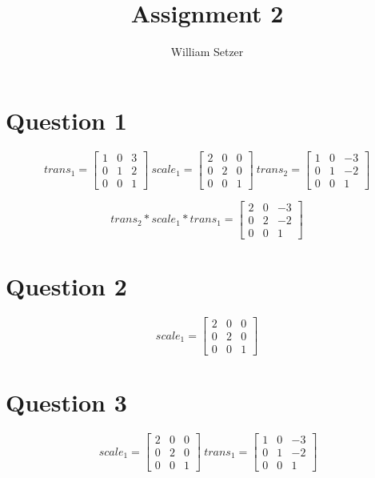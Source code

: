 \documentclass[10pt]{article}
\title{Assignment 2}
\author{William Setzer}
\begin{document}
\maketitle

\section*{Question 1}

\[
  trans_1 = 
  \begin{bmatrix}
    1 & 0 & 3 \\
    0 & 1 & 2 \\
    0 & 0 & 1
  \end{bmatrix}
  \ scale_1 =
  \begin{bmatrix}
    2 & 0 & 0 \\
    0 & 2 & 0 \\
    0 & 0 & 1
  \end{bmatrix}
  \ trans_2 =
  \begin{bmatrix}
    1 & 0 & -3 \\
    0 & 1 & -2 \\
    0 & 0 &  1
  \end{bmatrix}
\]

\[
  trans_2 * scale_1 * trans_1 =
  \begin{bmatrix}
    2 & 0 & -3 \\
    0 & 2 & -2 \\
    0 & 0 &  1
  \end{bmatrix}
\]

\section*{Question 2}

\[
  scale_1 =
  \begin{bmatrix}
    2 & 0 & 0 \\
    0 & 2 & 0 \\
    0 & 0 & 1
  \end{bmatrix}
\]

\section*{Question 3}

\[
  \ scale_1 =
  \begin{bmatrix}
    2 & 0 & 0 \\
    0 & 2 & 0 \\
    0 & 0 & 1
  \end{bmatrix}
  \ trans_1 =
  \begin{bmatrix}
    1 & 0 & -3 \\
    0 & 1 & -2 \\
    0 & 0 &  1
  \end{bmatrix}
\]
\end{document}
